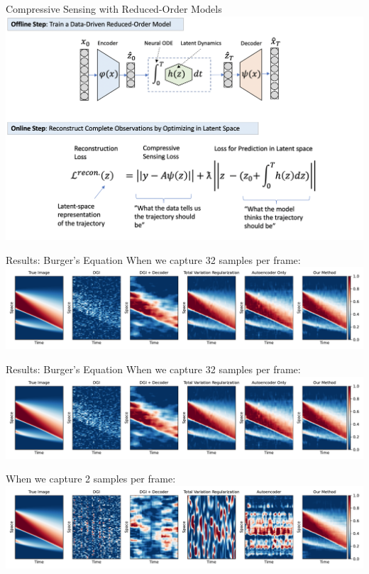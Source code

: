 \documentclass[8pt]{beamer}
\begin{document}
\begin{frame}{Compressive Sensing with Reduced-Order Models}
	\includegraphics[width=\textwidth]{Figures/cs_schematics.png}
\end{frame}

\begin{frame}{Results: Burger's Equation}
	When we capture 32 samples per frame:
	\includegraphics[width=\textwidth]{Figures/cs_burgers_comparison_32.pdf}
\end{frame}

\begin{frame}{Results: Burger's Equation}
	When we capture 32 samples per frame:
	\includegraphics[width=\textwidth]{Figures/cs_burgers_comparison_32.pdf}
	
	When we capture 2 samples per frame:
	\includegraphics[width=\textwidth]{Figures/cs_burgers_comparison_2.pdf}
\end{frame}
\end{document}
